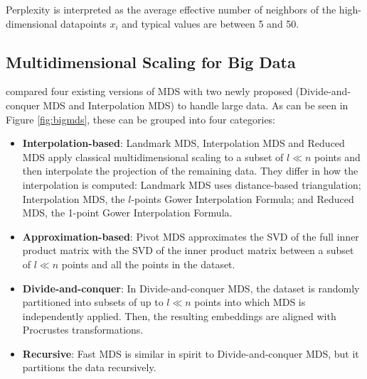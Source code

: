 Perplexity is interpreted as the average effective number of neighbors of the high-dimensional datapoints $x_i$ and typical values are between 5 and 50.

\subsection{Multidimensional Scaling for Big Data}

\cite{Delicado2024} compared four existing versions of MDS with two newly proposed (Divide-and-conquer MDS and Interpolation MDS) to handle large data. As can be seen in Figure \ref{fig:bigmds}, these can be grouped into four categories:

\begin{itemize}
    \item \textbf{Interpolation-based}: Landmark MDS, Interpolation MDS and Reduced MDS apply classical multidimensional scaling to a subset of $l \ll n$ points and then interpolate the projection of the remaining data. They differ in how the interpolation is computed: Landmark MDS uses distance-based triangulation; Interpolation MDS, the $l$-points Gower Interpolation Formula; and Reduced MDS, the 1-point Gower Interpolation Formula.
    \item \textbf{Approximation-based}: Pivot MDS approximates the SVD of the full inner product matrix with the SVD of the inner product matrix between a subset of $l \ll n$ points and all the points in the dataset.
    \item \textbf{Divide-and-conquer}: In Divide-and-conquer MDS, the dataset is randomly partitioned into subsets of up to $l \ll n$ points into which MDS is independently applied. Then, the resulting embeddings are aligned with Procrustes transformations.
    \item \textbf{Recursive}: Fast MDS is similar in spirit to Divide-and-conquer MDS, but it partitions the data recursively. 
\end{itemize}

